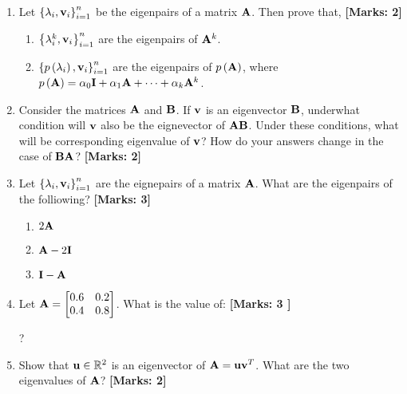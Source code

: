 \documentclass[12pt]{article}
\def\mf{\ensuremath\mathbf}
\def\mb{\ensuremath\mathbb}
\def\lp{\ensuremath\left(}
\def\rp{\ensuremath\right)}
\def\lc{\ensuremath\left\{}
\def\rc{\ensuremath\right\}}
\def\bmx{\ensuremath\begin{bmatrix*}[r]}
\def\emx{\ensuremath\end{bmatrix*}}
\begin{document}
\begin{enumerate}
    \item Let $\lc\lambda_i, \mf{v}_i\rc_{i=1}^n$ be the eigenpairs of a matrix $\mf{A}$. Then prove that, \textbf{[Marks: 2]}
    \begin{enumerate}
        \item $\lc\lambda_i^k, \mf{v}_i\rc_{i=1}^n$ are the eigenpairs of $\mf{A}^k$. 
        \item $\lc p\lp\lambda_i\rp, \mf{v}_i\rc_{i=1}^n$ are the eigenpairs of $p\lp\mf{A}\rp$, where $p\lp \mf{A}\rp = \alpha_0\mf{I} + \alpha_1\mf{A} + \cdots + \alpha_k\mf{A}^k$.
    \end{enumerate}

    \item Consider the matrices $\mf{A}$ and $\mf{B}$. If $\mf{v}$ is an eigenvector $\mf{B}$, underwhat condition will $\mf{v}$ also be the eignevector of $\mf{A}\mf{B}$. Under these conditions, what will be corresponding eigenvalue of $\mf{v}$? How do your answers change in the case of $\mf{BA}$? \textbf{[Marks: 2]}

    \item Let $\lc \lambda_i, \mf{v}_i\rc_{i=1}^n$ are the eignepairs of a matrix $\mf{A}$. What are the eigenpairs of the folliowing? \textbf{[Marks: 3]}
    \begin{enumerate}
         \item $2\mf{A}$
         \item $\mf{A} - 2\mf{I}$
         \item $\mf{I} - \mf{A}$
     \end{enumerate}

     \item Let $\mf{A} = \bmx 0.6 & 0.2\\ 0.4 & 0.8\emx$. What is the value of: \textbf{[Marks: 3 ]}
     ?

     \item Show that $\mf{u} \in \mb{R}^2$ is an eigenvector of $\mf{A} = \mf{u}\mf{v}^T$. What are the two eigenvalues of $\mf{A}$? \textbf{[Marks: 2]}


\end{enumerate}
\end{document}

